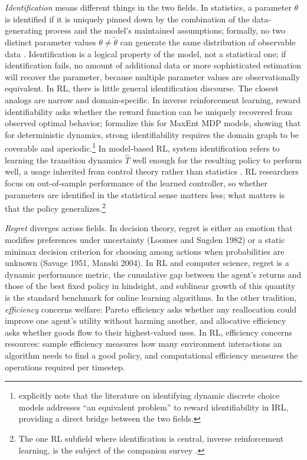 \textit{Identification} means different things in the two fields. In statistics, a parameter $\theta$ is identified if it is uniquely pinned down by the combination of the data-generating process and the model's maintained assumptions; formally, no two distinct parameter values $\theta \neq \tilde{\theta}$ can generate the same distribution of observable data \citep{Lewbel2019}. Identification is a logical property of the model, not a statistical one; if identification fails, no amount of additional data or more sophisticated estimation will recover the parameter, because multiple parameter values are observationally equivalent. In RL, there is little general identification discourse. The closest analogs are narrow and domain-specific. In inverse reinforcement learning, reward identifiability asks whether the reward function can be uniquely recovered from observed optimal behavior; \citet{KimGarg2021} formalize this for MaxEnt MDP models, showing that for deterministic dynamics, strong identifiability requires the domain graph to be coverable and aperiodic.\footnote{\citet{KimGarg2021} explicitly note that the literature on identifying dynamic discrete choice models \citep{rust1994structural} addresses ``an equivalent problem'' to reward identifiability in IRL, providing a direct bridge between the two fields.} In model-based RL, system identification refers to learning the transition dynamics $\hat{T}$ well enough for the resulting policy to perform well, a usage inherited from control theory rather than statistics \citep{RossBagnell2012}. RL researchers focus on out-of-sample performance of the learned controller, so whether parameters are identified in the statistical sense matters less; what matters is that the policy generalizes.\footnote{The one RL subfield where identification is central, inverse reinforcement learning, is the subject of the companion survey \citep{RustRawat2026}.}

\textit{Regret} diverges across fields. In decision theory, regret is either an emotion that modifies preferences under uncertainty (Loomes and Sugden 1982) or a static minimax decision criterion for choosing among actions when probabilities are unknown (Savage 1951, Manski 2004). In RL and computer science, regret is a dynamic performance metric, the cumulative gap between the agent's returns and those of the best fixed policy in hindsight, and sublinear growth of this quantity is the standard benchmark for online learning algorithms. In the other tradition, \textit{efficiency} concerns welfare: Pareto efficiency asks whether any reallocation could improve one agent's utility without harming another, and allocative efficiency asks whether goods flow to their highest-valued uses. In RL, efficiency concerns resources: sample efficiency measures how many environment interactions an algorithm needs to find a good policy, and computational efficiency measures the operations required per timestep.

